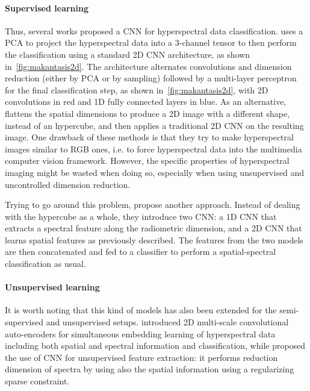 \documentclass[journal]{IEEEtran}
\begin{document}
\paragraph{Supervised learning} Thus, several works proposed a CNN for hyperspectral data classification. \cite{makantasis_deep_2015} uses a PCA to project the hyperspectral data into a 3-channel tensor to then perform the classification using a standard 2D CNN architecture, as shown in~\cref{fig:makantasis2d}. The architecture alternates convolutions and dimension reduction (either by PCA or by sampling) followed by a multi-layer perceptron for the final classification step, as shown in~\cref{fig:makantasis2d}, with 2D convolutions in red and 1D fully connected layers in blue. As an alternative, \cite{slavkovikj_hyperspectral_2015} flattens the spatial dimensions to produce a 2D image with a different shape, instead of an hypercube, and then applies a traditional 2D CNN on the resulting image. One drawback of these methods is that they try to make hyperspectral images similar to RGB ones, i.e. to force hyperspectral data into the multimedia computer vision framework. However, the specific properties of hyperspectral imaging might be wasted when doing so, especially when using unsupervised and uncontrolled dimension reduction.

Trying to go around this problem, \cite{zhao_spectral-spatial_2016,yue_spectral-spatial_2015} propose another approach. Instead of dealing with the hypercube as a whole, they introduce two CNN: a 1D CNN that extracts a spectral feature along the radiometric dimension, and a 2D CNN that learns spatial features as previously described. The features from the two models are then concatenated and fed to a classifier to perform a spatial-spectral classification as usual.

\paragraph{Unsupervised learning} It is worth noting that this kind of models has also been extended for the semi-supervised and unsupervised setups. \cite{zhao_combining_2015} introduced 2D multi-scale convolutional auto-encoders for simultaneous embedding learning of hyperspectral data including both spatial and spectral information and classification, while \cite{romero_unsupervised_2016} proposed the use of CNN for unsupervised feature extraction: it performs reduction dimension of spectra by using also the spatial information using a regularizing sparse constraint.
\end{document}
